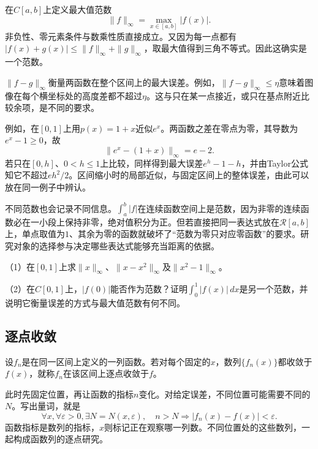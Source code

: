 在\(C[a,b]\)上定义{\heiti{}最大值范数}
\begin{equation*}
 \|f\|_\infty=\max_{x\in[a,b]}|f(x)|.
\end{equation*}
非负性、零元素条件与数乘性质直接成立。又因为每一点都有\(|f(x)+g(x)|\le\|f\|_\infty+\|g\|_\infty\)，取最大值得到三角不等式。因此这确实是一个范数。

\(\|f-g\|_\infty\)衡量两函数在整个区间上的最大误差。例如，\(\|f-g\|_\infty\le\eta\)意味着图像在每个横坐标处的高度差都不超过\(\eta\)。这与只在某一点接近，或只在基点附近比较余项，是不同的要求。

例如，在\([0,1]\)上用\(p(x)=1+x\)近似\(e^x\)。两函数之差在零点为零，其导数为\(e^x-1\ge0\)，故
\begin{equation*}
 \|e^x-(1+x)\|_\infty=e-2.
\end{equation*}
若只在\([0,h]\)、\(0<h\le1\)上比较，同样得到最大误差\(e^h-1-h\)，并由Taylor公式知它不超过\(eh^2/2\)。区间缩小时的局部近似，与固定区间上的整体误差，由此可以放在同一例子中辨认。

不同范数也会记录不同信息。\(\int_a^b|f|\)在连续函数空间上是范数，因为非零的连续函数必在一小段上保持非零，绝对值积分为正。但若直接把同一表达式放在\(\mathcal R[a,b]\)上，单点取值为\(1\)、其余为零的函数就破坏了“范数为零只对应零函数”的要求。研究对象的选择参与决定哪些表达式能够充当距离的依据。

\begin{exercise}
\mbox{}\par\nobreak

（1）在\([0,1]\)上求\(\|x\|_\infty\)、\(\|x-x^2\|_\infty\)及\(\|x^2-1\|_\infty\)。

（2）在\(C[0,1]\)上，\(|f(0)|\)能否作为范数？证明\(\int_0^1|f(x)|\,dx\)是另一个范数，并说明它衡量误差的方式与最大值范数有何不同。
\end{exercise}

\subsection{逐点收敛}

\begin{definition}
设\(f_n\)是在同一区间上定义的一列函数。若对每个固定的\(x\)，数列\(\{f_n(x)\}\)都收敛于\(f(x)\)，就称\(f_n\)在该区间上{\heiti{}逐点收敛}于\(f\)。
\end{definition}

此时先固定位置，再让函数的指标\(n\)变化。对给定误差，不同位置可能需要不同的\(N\)。写出量词，就是
\begin{equation*}
 \forall x, \forall \varepsilon>0, \exists N=N(x,\varepsilon),
 \quad n>N\Longrightarrow |f_n(x)-f(x)|<\varepsilon.
\end{equation*}
函数指标是数列的指标，\(x\)则标记正在观察哪一列数。不同位置处的这些数列，一起构成函数列的逐点研究。

